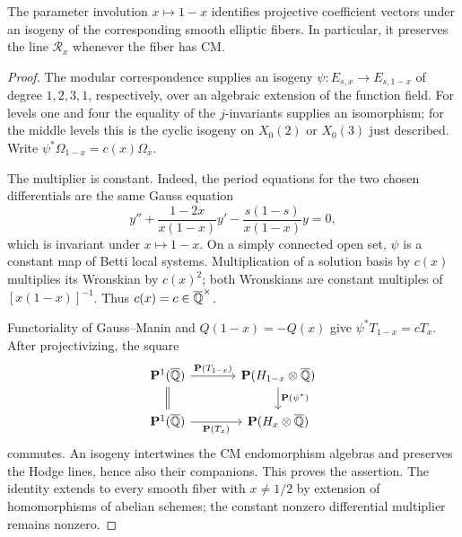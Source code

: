 \begin{lemma}
\label{lem:cm-involution-covariance}
The parameter involution $x\mapsto1-x$ identifies projective
coefficient vectors under an isogeny of the corresponding smooth
elliptic fibers.  In particular, it preserves the line
$\mathcal R_x$ whenever the fiber has CM.
\end{lemma}
\begin{proof}
The modular correspondence supplies an isogeny
$\psi:E_{s,x}\to E_{s,1-x}$ of degree $1,2,3,1$, respectively,
over an algebraic extension of the function field.  For levels one
and four the equality of the $j$-invariants supplies an isomorphism;
for the middle levels this is the cyclic isogeny on $X_0(2)$ or
$X_0(3)$ just described.  Write
$\psi^*\Omega_{1-x}=c(x)\Omega_x$.

The multiplier is constant.  Indeed, the period equations for the
two chosen differentials are the same Gauss equation
\[
 y''+\frac{1-2x}{x(1-x)}y'
                 -\frac{s(1-s)}{x(1-x)}y=0,
\]
which is invariant under $x\mapsto1-x$.  On a simply connected
open set, $\psi$ is a constant map of Betti local systems.
Multiplication of a solution basis by $c(x)$ multiplies its
Wronskian by $c(x)^2$; both Wronskians are constant multiples of
$[x(1-x)]^{-1}$.  Thus $c(x)=c\in\overline{\mathbb Q}^\times$.

Functoriality of Gauss--Manin and $Q(1-x)=-Q(x)$ give
$\psi^*T_{1-x}=cT_x$.  After projectivizing, the square
\begin{equation}\label{eq:coefficient-covariance}
\begin{tikzcd}[column sep=large]
 \mathbf P^1(\Qbar) \arrow[r,"\mathbf P(T_{1-x})"]
                        \arrow[d,equal]
   & \mathbf P(H_{1-x}\otimes\Qbar)
                        \arrow[d,"\mathbf P(\psi^*)"]\\
 \mathbf P^1(\Qbar) \arrow[r,"\mathbf P(T_x)"']
   & \mathbf P(H_x\otimes\Qbar)
\end{tikzcd}
\end{equation}
commutes.  An isogeny intertwines the CM endomorphism algebras and
preserves the Hodge lines, hence also their companions.  This proves
the assertion.  The identity extends to every smooth fiber with
$x\ne1/2$ by extension of homomorphisms of abelian schemes; the
constant nonzero differential multiplier remains nonzero.
\end{proof}

